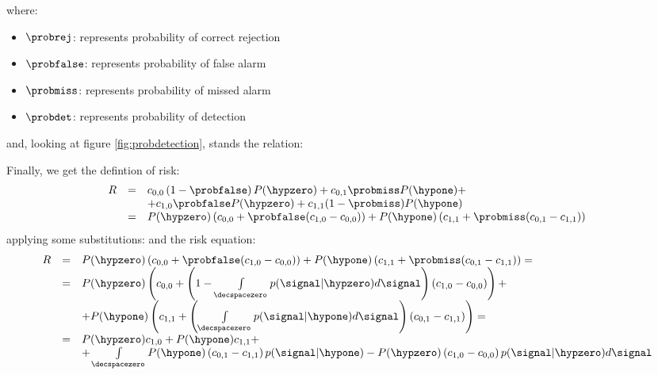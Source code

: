 where:
\begin{itemize}
\item $\probrej$: represents probability of correct rejection
\item $\probfalse$: represents probability of false alarm
\item $\probmiss$: represents probability of missed alarm
\item $\probdet$: represents probability of detection
\end{itemize}
and, looking at figure \ref{fig:probdetection}, stands the relation:

Finally, we get the defintion of risk:
\begin{equation}
\begin{array}{rcl} 
R & = & c_{0,0} \braces{1-\probfalse} P(\hypzero) + c_{0,1} \probmiss P(\hypone) + \\ 
  &   &  + c_{1,0} \probfalse P(\hypzero) + c_{1,1} (1-\probmiss) P(\hypone) \\
  & = & P(\hypzero) \braces{c_{0,0} + \probfalse (c_{1,0} - c_{0,0})} + P(\hypone) \braces{c_{1,1} + \probmiss (c_{0,1} - c_{1,1})}
\end{array}
\end{equation}
applying some substitutions:
and the risk equation:
\begin{equation}
\begin{array}{rcl}
R & = & P(\hypzero) \braces{c_{0,0} + \probfalse (c_{1,0} - c_{0,0})} + P(\hypone) \braces{c_{1,1} + \probmiss (c_{0,1} - c_{1,1})} = \\ 
  & = & P(\hypzero) \braces{c_{0,0} + \braces{1 - \int\limits_{\decspacezero}p(\signal|\hypzero)d\signal} (c_{1,0} - c_{0,0})} + \\ 
  &   &  + P(\hypone) \braces{c_{1,1} + \braces{\int\limits_{\decspacezero}p(\signal|\hypone)d\signal} (c_{0,1} - c_{1,1})} = \\ 
  & = & P(\hypzero) c_{1,0} + P(\hypone) c_{1,1} + \\
  &   & + \int\limits_{\decspacezero} P(\hypone)\braces{c_{0,1} - c_{1,1}} p(\signal|\hypone) - P(\hypzero)\braces{c_{1,0} - c_{0,0}} p(\signal|\hypzero) d\signal
\end{array}
\end{equation}
